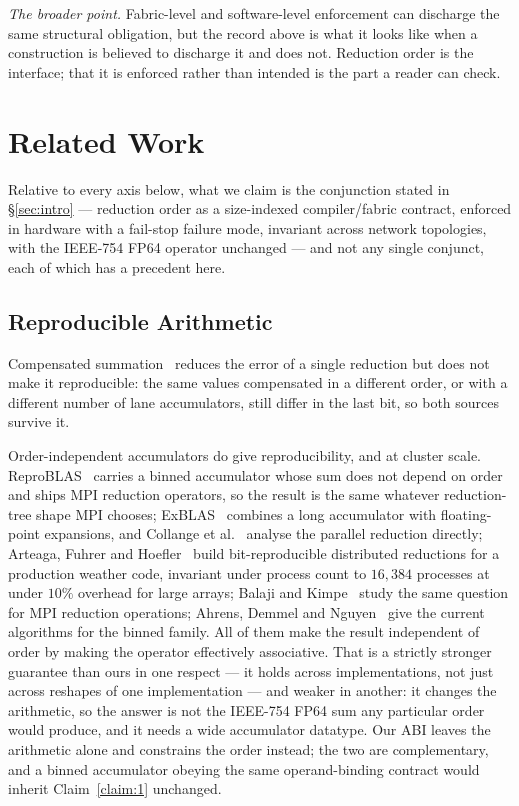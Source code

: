 \documentclass[journal,10pt]{IEEEtran}
\theoremstyle{plain}
\theoremstyle{definition}
\theoremstyle{remark}
\begin{document}
\emph{The broader point.} Fabric-level and software-level enforcement can
discharge the same structural obligation, but the record above is what it
looks like when a construction is believed to discharge it and does not.
Reduction order is the interface; that it is enforced rather than intended
is the part a reader can check.

\section{Related Work}\label{sec:related}

Relative to every axis below, what we claim is the conjunction stated in
\S\ref{sec:intro} --- reduction order as a size-indexed compiler/fabric
contract, enforced in hardware with a fail-stop failure mode, invariant
across network topologies, with the IEEE-754 FP64 operator unchanged --- and
not any single conjunct, each of which has a precedent here.

\subsection{Reproducible Arithmetic}

Compensated summation~\cite{kahan1965summation,higham2002accuracy,rump2009accurate}
reduces the error of a single reduction but does not make it reproducible:
the same values compensated in a different order, or with a different number
of lane accumulators, still differ in the last bit, so both sources survive
it.

Order-independent accumulators do give reproducibility, and at cluster
scale. ReproBLAS~\cite{demmel2013reproBLAS} carries a binned accumulator
whose sum does not depend on order and ships MPI reduction operators, so the
result is the same whatever reduction-tree shape MPI chooses;
ExBLAS~\cite{iakymchuk2016exblas} combines a long accumulator with
floating-point expansions, and Collange et al.~\cite{collange2015reproducible}
analyse the parallel reduction directly; Arteaga, Fuhrer and
Hoefler~\cite{arteaga2014bitreproducible} build bit-reproducible distributed
reductions for a production weather code, invariant under process count to
$16{,}384$ processes at under $10\%$ overhead for large arrays; Balaji and
Kimpe~\cite{balaji2013reproducible} study the same question for MPI
reduction operations; Ahrens, Demmel and Nguyen~\cite{ahrens2020reproducible}
give the current algorithms for the binned family. All of them make the
result independent of order by making the operator effectively associative.
That is a strictly stronger guarantee than ours in one respect --- it holds
across implementations, not just across reshapes of one implementation ---
and weaker in another: it changes the arithmetic, so the answer is not the
IEEE-754 FP64 sum any particular order would produce, and it needs a wide
accumulator datatype. Our ABI leaves the arithmetic alone and constrains the
order instead; the two are complementary, and a binned accumulator obeying
the same operand-binding contract would inherit Claim~\ref{claim:1}
unchanged.
\end{document}
